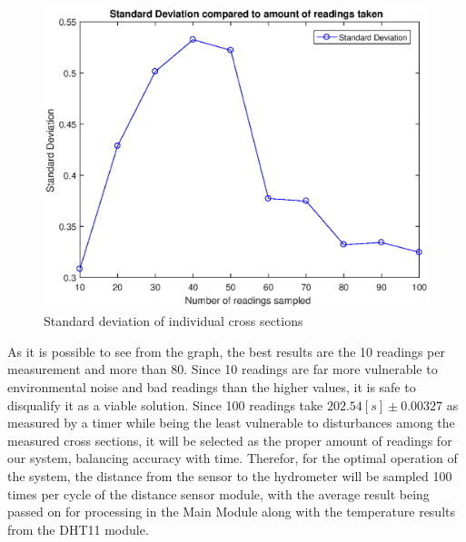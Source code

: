 \documentclass[twoside]{ctuthesis}
\theoremstyle{plain}
\theoremstyle{definition}
\theoremstyle{note}
\begin{document}
\begin{figure}[H]
	\centering
	\includegraphics[width = \textwidth]{CrossSectionReadingsStd}
	\caption{Standard deviation of individual cross sections}
\end{figure}


As it is possible to see from the graph, the best results are the 10 readings per measurement and more than 80. Since 10 readings are far more vulnerable to environmental noise and bad readings than the higher values, it is safe to disqualify it as a viable solution. Since 100 readings take $202.54[s]\pm0.00327$ as measured by a timer while being the least vulnerable to disturbances among the measured cross sections, it will be selected as the proper amount of readings for our system, balancing accuracy with time.
Therefor, for the optimal operation of the system, the distance from the sensor to the hydrometer will be sampled 100 times per cycle of the distance sensor module, with the average result being passed on for processing in the Main Module along with the temperature results from the DHT11 module.
\end{document}
